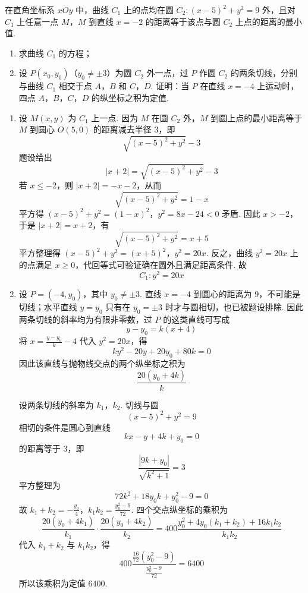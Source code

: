 \begin{problem}
在直角坐标系 \(xOy\) 中，曲线 \(C_1\) 上的点均在圆 \(C_2:(x-5)^2+y^2=9\) 外，且对 \(C_1\) 上任意一点 \(M\)，\(M\) 到直线 \(x=-2\) 的距离等于该点与圆 \(C_2\) 上点的距离的最小值.

\begin{enumerate}
\item 求曲线 \(C_1\) 的方程；
\item 设 \(P(x_0,y_0)\)（\(y_0\neq\pm3\)）为圆 \(C_2\) 外一点，过 \(P\) 作圆 \(C_2\) 的两条切线，分别与曲线 \(C_1\) 相交于点 \(A\)，\(B\) 和 \(C\)，\(D\). 证明：当 \(P\) 在直线 \(x=-4\) 上运动时，四点 \(A\)，\(B\)，\(C\)，\(D\) 的纵坐标之积为定值.
\end{enumerate}

\begin{solution}
\begin{enumerate}
\item 设 \(M(x,y)\) 为 \(C_1\) 上一点. 因为 \(M\) 在圆 \(C_2\) 外，\(M\) 到圆上点的最小距离等于 \(M\) 到圆心 \(O(5,0)\) 的距离减去半径 \(3\)，即
\[
\sqrt{(x-5)^2+y^2}-3
\]
题设给出
\[
|x+2|=\sqrt{(x-5)^2+y^2}-3
\]
若 \(x\leqslant-2\)，则 \(|x+2|=-x-2\)，从而
\[
\sqrt{(x-5)^2+y^2}=1-x
\]
平方得
\((x-5)^2+y^2=(1-x)^2\)，\(y^2=8x-24<0\)
矛盾. 因此 \(x>-2\)，于是 \(|x+2|=x+2\)，有
\[
\sqrt{(x-5)^2+y^2}=x+5
\]
平方整理得
\((x-5)^2+y^2=(x+5)^2\)，\(y^2=20x\).
反之，曲线 \(y^2=20x\) 上的点满足 \(x\geqslant0\)，代回等式可验证确在圆外且满足距离条件. 故
\[
C_1:y^2=20x
\]

\item 设 \(P=(-4,y_0)\)，其中 \(y_0\neq\pm3\). 直线 \(x=-4\) 到圆心的距离为 \(9\)，不可能是切线；水平直线 \(y=y_0\) 只有在 \(y_0=\pm3\) 时才与圆相切，也已被题设排除. 因此两条切线的斜率均为有限非零数，过 \(P\) 的这类直线可写成
\[
y-y_0=k(x+4)
\]
将 \(x=\frac{y-y_0}{k}-4\) 代入 \(y^2=20x\)，得
\[
ky^2-20y+20y_0+80k=0
\]
因此该直线与抛物线交点的两个纵坐标之积为
\[
\frac{20(y_0+4k)}{k}
\]

设两条切线的斜率为 \(k_1\)，\(k_2\). 切线与圆
\[
(x-5)^2+y^2=9
\]
相切的条件是圆心到直线
\[
kx-y+4k+y_0=0
\]
的距离等于 \(3\)，即
\[
\frac{|9k+y_0|}{\sqrt{k^2+1}}=3
\]
平方整理为
\[
72k^2+18y_0k+y_0^2-9=0
\]
故
\(k_1+k_2=-\frac{y_0}{4}\)，\(k_1k_2=\frac{y_0^2-9}{72}\).
四个交点纵坐标的乘积为
\[
\frac{20(y_0+4k_1)}{k_1}\cdot
\frac{20(y_0+4k_2)}{k_2}
=400\frac{y_0^2+4y_0(k_1+k_2)+16k_1k_2}{k_1k_2}
\]
代入 \(k_1+k_2\) 与 \(k_1k_2\)，得
\[
400\frac{\frac{16}{72}(y_0^2-9)}
{\frac{y_0^2-9}{72}}
=6400
\]
所以该乘积为定值 \(6400\).
\end{enumerate}
\end{solution}
\end{problem}

